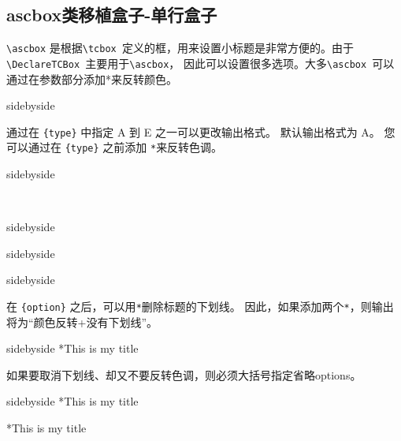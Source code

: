 \subsection{ascbox类移植盒子-单行盒子}
\verb|\ascbox| 是根据\verb|\tcbox |定义的框，用来设置小标题是非常方便的。由于\verb|\DeclareTCBox |主要用于\verb|\ascbox|，
因此可以设置很多选项。大多\verb|\ascbox |可以通过在参数部分添加*来反转颜色。

\begin{tcblisting}{sidebyside}
    
\end{tcblisting}

通过在 \verb|{type}| 中指定 A 到 E 之一可以更改输出格式。 默认输出格式为 A。 您可以通过在 \verb|{type}| 之前添加 \verb|*|来反转色调。
\begin{tcblisting}{sidebyside}
    
\end{tcblisting}

\
\begin{tcblisting}{sidebyside}
    
\end{tcblisting}
\begin{tcblisting}{sidebyside}
    
\end{tcblisting}
\begin{tcblisting}{sidebyside}
    
\end{tcblisting}


在 \verb|{option}| 之后，可以用\verb|*|删除标题的下划线。 因此，如果添加两个\verb|*|，则输出将为“颜色反转+没有下划线”。

\begin{tcblisting}{sidebyside}
    \ascboxB**{This is my title} 
\end{tcblisting}

如果要取消下划线、却又不要反转色调，则必须大括号指定省略options。
\begin{tcblisting}{sidebyside}
    \ascboxB[A][]*{This is my title}
    
    \ascboxB*[C][]*{This is my title}
\end{tcblisting}


